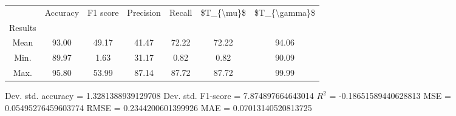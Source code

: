 \begin{tabular}{|c|c|c|c|c|c|c|}
\toprule
{} &  Accuracy &  F1 score &  Precision &  Recall &  \$T\_\{\textbackslash mu\}\$ &  \$T\_\{\textbackslash gamma\}\$ \\
Results &           &           &            &         &            &               \\
\hline
Mean    &     93.00 &     49.17 &      41.47 &   72.22 &      72.22 &         94.06 \\
Min.    &     89.97 &      1.63 &      31.17 &    0.82 &       0.82 &         90.09 \\
Max.    &     95.80 &     53.99 &      87.14 &   87.72 &      87.72 &         99.99 \\
\bottomrule
\end{tabular}

 Dev. std. accuracy = 1.3281388939129708
 Dev. std. F1-score = 7.874897664643014
 $R^2$ = -0.18651589440628813
 MSE = 0.05495276459603774
 RMSE = 0.2344200601399926
 MAE = 0.07013140520813725